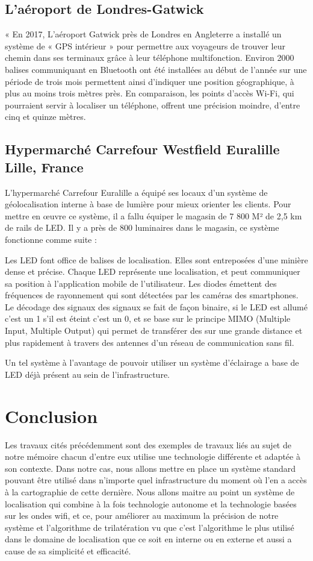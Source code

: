 \documentclass[12pt,a4paper]{report}
\begin{document}
\subsection{L’aéroport de Londres-Gatwick }
« En 2017, L’aéroport Gatwick près de Londres en Angleterre a installé un système de « GPS intérieur » pour permettre aux voyageurs de trouver leur chemin dans ses terminaux grâce à leur téléphone multifonction. Environ 2000 balises communiquant en Bluetooth ont été installées au début de l’année sur une période de trois mois permettent ainsi d’indiquer une position géographique, à plus au moins trois mètres près. En comparaison, les points d’accès Wi-Fi, qui pourraient servir à localiser un téléphone, offrent une précision moindre, d’entre cinq et quinze mètres.\cite{WEBSITE:2}

\subsection{Hypermarché Carrefour  Westfield Euralille Lille, France}
L’hypermarché Carrefour Euralille a équipé ses locaux d’un système de géolocalisation interne à base de lumière pour mieux orienter les clients.
Pour mettre en œuvre ce système, il a fallu équiper le magasin de 7 800 M² de 2,5 km de rails de LED. Il y a près de 800 luminaires dans le magasin, ce système fonctionne comme suite :

Les LED font office de balises de localisation. Elles sont entreposées d’une minière dense et précise. Chaque LED représente une localisation, et peut communiquer sa position à l’application mobile de l’utilisateur. Les diodes émettent des fréquences de rayonnement qui sont détectées par les caméras des smartphones. Le décodage des signaux des signaux se fait de façon binaire, si le LED est allumé c’est un 1 s’il est éteint c’est un 0, et se base sur le principe  MIMO (Multiple Input, Multiple Output) qui permet de transférer des sur une grande distance et plus rapidement à travers des antennes d’un réseau de communication sans fil.

Un tel système à l’avantage de pouvoir utiliser un système d’éclairage a base de LED déjà présent au sein de l’infrastructure.

\section{Conclusion}

Les travaux cités précédemment sont des exemples de travaux liés au sujet de notre mémoire chacun d’entre eux utilise une technologie différente et adaptée à son contexte. 
Dans notre cas, nous allons mettre en place un système standard pouvant être utilisé dans n’importe quel infrastructure du moment où l’en a accès à la cartographie de cette dernière.
Nous allons maitre au point un système de localisation qui combine à la fois technologie autonome et la technologie basées sur les ondes wifi, et ce, pour améliorer au maximum la précision de notre système et l’algorithme de trilatération vu que c’est l’algorithme le plus utilisé dans le domaine de localisation que ce soit en interne ou en externe et aussi a cause de sa simplicité et efficacité.
\end{document}
